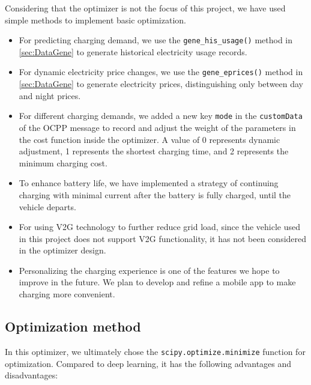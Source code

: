 \documentclass[
	english,
	ruledheaders=section,%
	class=report,%
	thesis={type=Report},%
	accentcolor=9c,%
	custommargins=true,%
	marginpar=false,%
	parskip=half-,%
	fontsize=11pt,%
	logofile={img/tuda_logo.pdf}, %
]{tudapub}
\begin{document}
Considering that the optimizer is not the focus of this project, we have used simple methods to implement basic optimization.

\begin{itemize}
    \item For predicting charging demand, we use the \texttt{gene\_his\_usage()} method in \autoref{sec:DataGene} to generate historical electricity usage records.
    \item For dynamic electricity price changes, we use the \texttt{gene\_eprices()} method in \autoref{sec:DataGene} to generate electricity prices, distinguishing only between day and night prices.
    \item For different charging demands, we added a new key \texttt{mode} in the \texttt{customData} of the \ac{OCPP} message to record and adjust the weight of the parameters in the cost function inside the optimizer. A value of 0 represents dynamic adjustment, 1 represents the shortest charging time, and 2 represents the minimum charging cost.
    \item To enhance battery life, we have implemented a strategy of continuing charging with minimal current after the battery is fully charged, until the vehicle departs.
    \item For using \ac{V2G} technology to further reduce grid load, since the vehicle used in this project does not support \ac{V2G} functionality, it has not been considered in the optimizer design.
    \item Personalizing the charging experience is one of the features we hope to improve in the future. We plan to develop and refine a mobile app to make charging more convenient.
\end{itemize}


\subsection{Optimization method}
\label{subsec: Optimization method}

In this optimizer, we ultimately chose the \texttt{scipy.optimize.minimize} function for optimization. Compared to deep learning, it has the following advantages and disadvantages:
\end{document}

